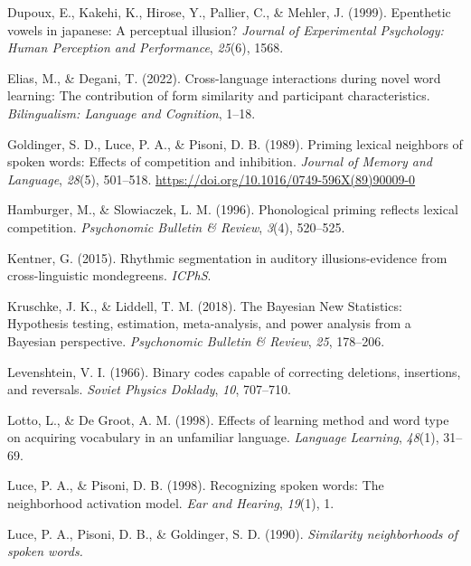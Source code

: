 \documentclass[
]{article}
\newlength{\cslhangindent}
\newenvironment{CSLReferences}[2] %
 {\begin{list}{}{%
  \setlength{\itemindent}{0pt}
  \setlength{\leftmargin}{0pt}
  \setlength{\parsep}{0pt}
  \ifodd #1
   \setlength{\leftmargin}{\cslhangindent}
   \setlength{\itemindent}{-1\cslhangindent}
  \fi
  \setlength{\itemsep}{#2\baselineskip}}}
 {\end{list}}
\begin{document}
\begin{CSLReferences}{1}{0}
Dupoux, E., Kakehi, K., Hirose, Y., Pallier, C., \& Mehler, J. (1999).
Epenthetic vowels in japanese: A perceptual illusion? \emph{Journal of
Experimental Psychology: Human Perception and Performance},
\emph{25}(6), 1568.

Elias, M., \& Degani, T. (2022). Cross-language interactions during
novel word learning: {The} contribution of form similarity and
participant characteristics. \emph{Bilingualism: Language and
Cognition}, 1--18.

Goldinger, S. D., Luce, P. A., \& Pisoni, D. B. (1989). Priming lexical
neighbors of spoken words: {Effects} of competition and inhibition.
\emph{Journal of Memory and Language}, \emph{28}(5), 501--518.
\url{https://doi.org/10.1016/0749-596X(89)90009-0}

Hamburger, M., \& Slowiaczek, L. M. (1996). Phonological priming
reflects lexical competition. \emph{Psychonomic Bulletin \& Review},
\emph{3}(4), 520--525.

Kentner, G. (2015). Rhythmic segmentation in auditory illusions-evidence
from cross-linguistic mondegreens. \emph{ICPhS}.

Kruschke, J. K., \& Liddell, T. M. (2018). The {Bayesian New
Statistics}: {Hypothesis} testing, estimation, meta-analysis, and power
analysis from a {Bayesian} perspective. \emph{Psychonomic Bulletin \&
Review}, \emph{25}, 178--206.

Levenshtein, V. I. (1966). Binary codes capable of correcting deletions,
insertions, and reversals. \emph{Soviet Physics Doklady}, \emph{10},
707--710.

Lotto, L., \& De Groot, A. M. (1998). Effects of learning method and
word type on acquiring vocabulary in an unfamiliar language.
\emph{Language Learning}, \emph{48}(1), 31--69.

Luce, P. A., \& Pisoni, D. B. (1998). Recognizing spoken words: {The}
neighborhood activation model. \emph{Ear and Hearing}, \emph{19}(1), 1.

Luce, P. A., Pisoni, D. B., \& Goldinger, S. D. (1990). \emph{Similarity
neighborhoods of spoken words.}


\end{CSLReferences}
\end{document}
